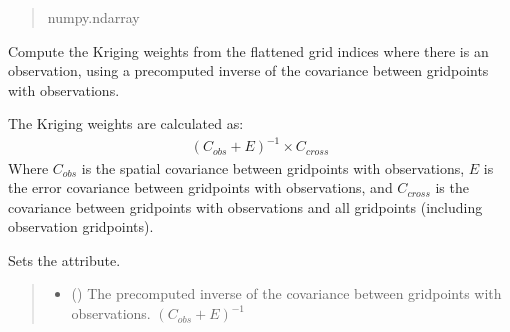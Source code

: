 \documentclass[letterpaper,10pt,english]{sphinxmanual}
\begin{document}
\begin{fulllineitems}
\begin{fulllineitems}
\begin{quote}
\begin{description}
\sphinxAtStartPar
numpy.ndarray

\end{description}\end{quote}

\end{fulllineitems}


\begin{fulllineitems}
\label{\detokenize{kriging:glomar_gridding.kriging.SimpleKriging.kriging_weights_from_inverse}}
\pysigstartsignatures
\pysiglinewithargsret
{}
{\sphinxparamcomma {}}
{}
\pysigstopsignatures
\sphinxAtStartPar
Compute the Kriging weights from the flattened grid indices where
there is an observation, using a pre\sphinxhyphen{}computed inverse of the covariance
between grid\sphinxhyphen{}points with observations.

\sphinxAtStartPar
The Kriging weights are calculated as:
\begin{equation*}
\begin{split}(C_{obs} + E)^{-1} \times C_{cross}\end{split}
\end{equation*}
\sphinxAtStartPar
Where \(C_{obs}\) is the spatial covariance between grid\sphinxhyphen{}points
with observations, \(E\) is the error covariance between grid\sphinxhyphen{}points
with observations, and \(C_{cross}\) is the covariance between
grid\sphinxhyphen{}points with observations and all grid\sphinxhyphen{}points (including observation
grid\sphinxhyphen{}points).

\sphinxAtStartPar
Sets the  attribute.
\begin{quote}\begin{description}
\begin{itemize}
\item {}
\sphinxAtStartPar
{} () \textendash{} The pre\sphinxhyphen{}computed inverse of the covariance between grid\sphinxhyphen{}points with
observations. \((C_{obs} + E)^{-1}\)


\end{itemize}
\end{description}
\end{quote}
\end{fulllineitems}
\end{fulllineitems}
\end{document}
